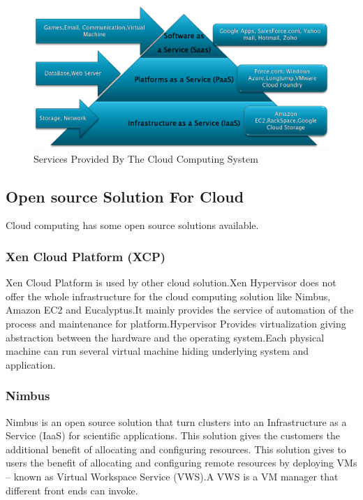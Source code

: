 \documentclass {report}
\begin{document}
\begin{figure}
\begin{center}
\includegraphics [scale=0.3]{as}
\caption{Services Provided By The Cloud Computing System}
\end{center}
\end{figure}


\subsection{Open source Solution For Cloud}

Cloud computing has some open source solutions available.

\subsubsection{Xen Cloud Platform (XCP)}
Xen Cloud Platform is used by other cloud solution.Xen Hypervisor does not offer the
whole infrastructure for the cloud computing solution like Nimbus, Amazon EC2 and 
Eucalyptus.It mainly provides the service of automation of the process and 
maintenance for platform.Hypervisor Provides virtualization giving abstraction 
between the hardware and the operating system.Each physical machine can run
several virtual machine hiding underlying system and application.\\


\subsubsection{Nimbus}
Nimbus is an open source solution that turn clusters into an Infrastructure 
as a Service (IaaS) for scientific applications. 
This solution gives the customers the additional benefit of allocating and configuring
resources.
This solution gives to users the benefit of allocating and configuring remote 
resources by deploying VMs – known as Virtual Workspace Service (VWS).A VWS is 
a VM manager that different front ends can invoke. \\
\end{document}

